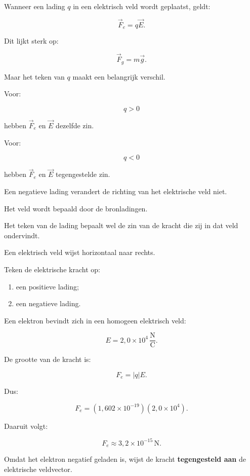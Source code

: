 \documentclass{ximera}
\begin{document}
Wanneer een lading $q$ in een elektrisch veld wordt geplaatst, geldt:

\[
\boxed{
\vec F_e=q\vec E.
}
\]

Dit lijkt sterk op:

\[
\vec F_g=m\vec g.
\]

Maar het teken van $q$ maakt een belangrijk verschil.


Voor:

\[
q>0
\]

hebben $\vec F_e$ en $\vec E$ dezelfde zin.


Voor:

\[
q<0
\]

hebben $\vec F_e$ en $\vec E$ tegengestelde zin.


\begin{opmerking}

Een negatieve lading verandert de richting van het elektrische veld
niet.

Het veld wordt bepaald door de bronladingen.

Het teken van de lading bepaalt wel de zin van de kracht die zij in dat
veld ondervindt.

\end{opmerking}


\begin{oefening}{\oefB\ESS}

Een elektrisch veld wijst horizontaal naar rechts.

Teken de elektrische kracht op:

\begin{enumerate}
  \item een positieve lading;
  \item een negatieve lading.
\end{enumerate}

\end{oefening}



\begin{voorbeeld}

Een elektron bevindt zich in een homogeen elektrisch veld:

\[
E=2{,}0\times10^4\,\mathrm{\frac NC}.
\]

De grootte van de kracht is:

\[
F_e=|q|E.
\]

Dus:

\[
F_e
=
(1{,}602\times10^{-19})
(2{,}0\times10^4).
\]

Daaruit volgt:

\[
\boxed{
F_e\approx3{,}2\times10^{-15}\,\mathrm N.
}
\]

Omdat het elektron negatief geladen is, wijst de kracht
\textbf{tegengesteld aan} de elektrische veldvector.

\end{voorbeeld}
\end{document}
